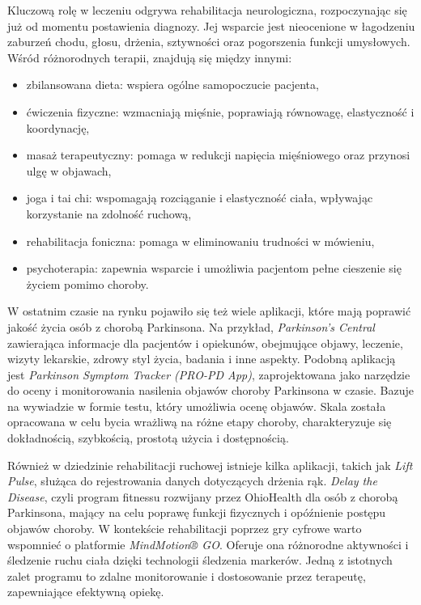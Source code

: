 Kluczową rolę w leczeniu odgrywa rehabilitacja neurologiczna, rozpoczynając się już od momentu postawienia diagnozy.
Jej wsparcie jest nieocenione w łagodzeniu zaburzeń chodu, głosu, drżenia, sztywności oraz pogorszenia funkcji umysłowych.
Wśród różnorodnych terapii, znajdują się między innymi:
\begin{itemize}[itemsep=0.1pt]
	\item zbilansowana dieta: wspiera ogólne samopoczucie pacjenta,
	\item ćwiczenia fizyczne: wzmacniają mięśnie, poprawiają równowagę, elastyczność i koordynację,
	\item masaż terapeutyczny: pomaga w redukcji napięcia mięśniowego oraz przynosi ulgę w objawach,
	\item joga i tai chi: wspomagają rozciąganie i elastyczność ciała, wpływając korzystanie na zdolność ruchową,
	\item rehabilitacja foniczna: pomaga w eliminowaniu trudności w mówieniu,
	\item psychoterapia: zapewnia wsparcie i umożliwia pacjentom pełne cieszenie się życiem pomimo choroby.
\end{itemize}


W ostatnim czasie na rynku pojawiło się też wiele aplikacji, które mają poprawić jakość życia osób z chorobą Parkinsona.
Na przykład, \emph{Parkinson's Central} zawierająca informacje dla pacjentów i opiekunów, obejmujące objawy, leczenie, wizyty lekarskie, zdrowy styl życia, badania i inne aspekty.
Podobną aplikacją jest \emph{Parkinson Symptom Tracker (PRO-PD App)}, zaprojektowana jako narzędzie do oceny i monitorowania nasilenia objawów choroby Parkinsona w czasie.
Bazuje na wywiadzie w formie testu, który umożliwia ocenę objawów.
Skala została opracowana w celu bycia wrażliwą na różne etapy choroby, charakteryzuje się dokładnością, szybkością, prostotą użycia i dostępnością.

Również w dziedzinie rehabilitacji ruchowej istnieje kilka aplikacji, takich jak \emph{Lift Pulse}, służąca do rejestrowania danych dotyczących drżenia rąk.
\emph{Delay the Disease}, czyli  program fitnessu rozwijany przez OhioHealth dla osób z chorobą Parkinsona, mający na celu poprawę funkcji fizycznych i opóźnienie postępu objawów choroby.
W kontekście rehabilitacji poprzez gry cyfrowe warto wspomnieć o platformie \emph{MindMotion® GO}.
Oferuje ona różnorodne aktywności i śledzenie ruchu ciała dzięki technologii śledzenia markerów.
Jedną z istotnych zalet programu to zdalne monitorowanie i dostosowanie przez terapeutę, zapewniające efektywną opiekę.

